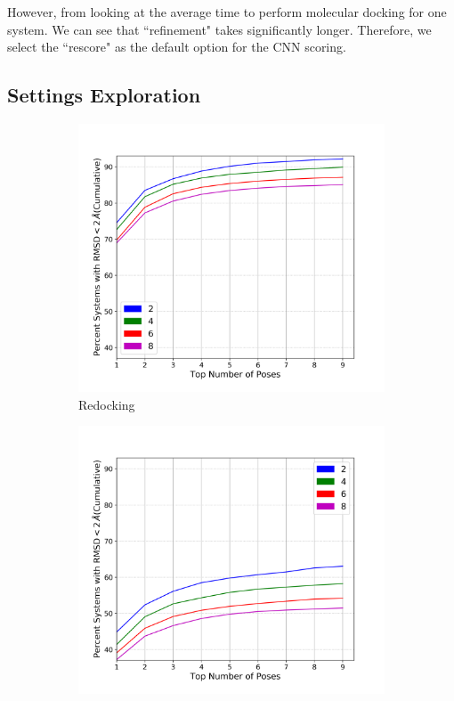 \documentclass[journal=jcisd8,manuscript=article]{achemso}
\begin{document}
However, from looking at the average time to perform molecular docking for one system. We can see that ``refinement" takes significantly longer. Therefore, we select the ``rescore" as the default option for the CNN scoring.

\subsection{Settings Exploration}
\begin{figure}    
        \begin{subfigure}[b]{0.48\textwidth}    
		\centering
		\includegraphics[width=\textwidth]{figures/redocking/sweep_autobox_add_line.png}
		\caption{Redocking}
		\label{fig:AutoboxAddRedock}
        \end{subfigure}    
        \begin{subfigure}[b]{0.48\textwidth}    
		\centering
		\includegraphics[width=\textwidth]{figures/crossdocking/sweep_autobox_add_line.png}

\end{subfigure}
\end{figure}
\end{document}
